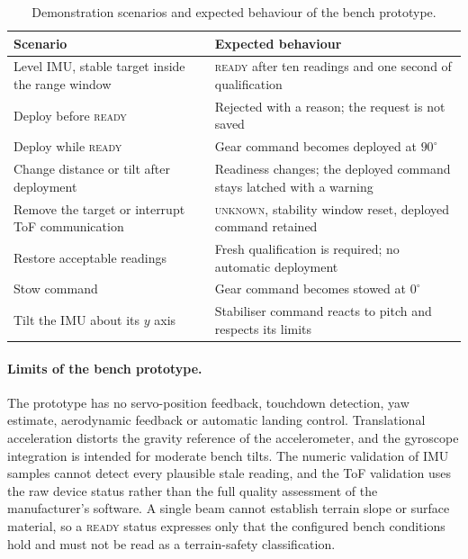 \documentclass[11pt,a4paper]{article}
\begin{document}
\begin{table}[ht]
\centering
\small
\begin{tabular}{@{}L{6.2cm} L{8.6cm}@{}}
\toprule
\textbf{Scenario} & \textbf{Expected behaviour}\\
\midrule
Level IMU, stable target inside the range window & \textsc{ready} after ten readings and one second of qualification\\
Deploy before \textsc{ready} & Rejected with a reason; the request is not saved\\
Deploy while \textsc{ready} & Gear command becomes deployed at $90^\circ$\\
Change distance or tilt after deployment & Readiness changes; the deployed command stays latched with a warning\\
Remove the target or interrupt ToF communication & \textsc{unknown}, stability window reset, deployed command retained\\
Restore acceptable readings & Fresh qualification is required; no automatic deployment\\
Stow command & Gear command becomes stowed at $0^\circ$\\
Tilt the IMU about its $y$ axis & Stabiliser command reacts to pitch and respects its limits\\
\bottomrule
\end{tabular}
\caption{Demonstration scenarios and expected behaviour of the bench prototype.}
\label{tab:benchchecks}
\end{table}
 
\paragraph{Limits of the bench prototype.} The prototype has no servo-position feedback, touchdown detection, yaw estimate, aerodynamic feedback or automatic landing control. Translational acceleration distorts the gravity reference of the accelerometer, and the gyroscope integration is intended for moderate bench tilts. The numeric validation of IMU samples cannot detect every plausible stale reading, and the ToF validation uses the raw device status rather than the full quality assessment of the manufacturer's software. A single beam cannot establish terrain slope or surface material, so a \textsc{ready} status expresses only that the configured bench conditions hold and must not be read as a terrain-safety classification.
 
 
\end{document}
